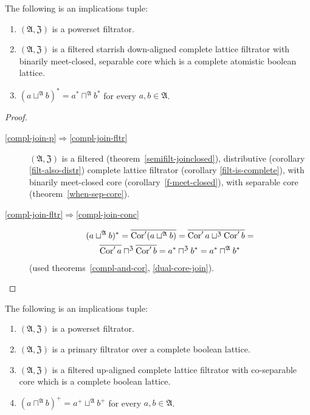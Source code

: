 \begin{thm}
\label{compl-join}The following is an implications tuple:
\begin{enumerate}
\item \label{compl-join-p}$(\mathfrak{A},\mathfrak{Z})$ is a powerset
filtrator.
\item \label{compl-join-fltr}$(\mathfrak{A},\mathfrak{Z})$ is a filtered
starrish down-aligned complete lattice filtrator with binarily meet-closed,
separable core which is a complete atomistic boolean lattice.
\item \label{compl-join-conc}$(a\sqcup^{\mathfrak{A}}b)^{\ast}=a^{\ast}\sqcap^{\mathfrak{A}}b^{\ast}$
for every $a,b\in\mathfrak{A}$.
\end{enumerate}
\end{thm}
\begin{proof}
~
\begin{description}
\item [{\ref{compl-join-p}$\Rightarrow$\ref{compl-join-fltr}}] $(\mathfrak{A},\mathfrak{Z})$
is a filtered (theorem~\ref{semifilt-joinclosed}), distributive
(corollary \ref{filt-also-distr}) complete lattice filtrator (corollary
\ref{filt-is-complete}), with binarily meet-closed core (corollary~\ref{f-meet-closed}),
with separable core (theorem~\ref{when-sep-core}).
\item [{\ref{compl-join-fltr}$\Rightarrow$\ref{compl-join-conc}}]
\begin{multline*}
(a\sqcup^{\mathfrak{A}}b)^{\ast}=\overline{\operatorname{Cor}'(a\sqcup^{\mathfrak{A}}b)}=\overline{\operatorname{Cor}'a\sqcup^{\mathfrak{Z}}\operatorname{Cor}'b}=\\\overline{\operatorname{Cor}'a}\sqcap^{\mathfrak{Z}}\overline{\operatorname{Cor}'b}=a^{\ast}\sqcap^{\mathfrak{Z}}b^{\ast}=a^{\ast}\sqcap^{\mathfrak{A}}b^{\ast}
\end{multline*}
(used theorems~\ref{compl-and-cor}, \ref{dual-core-join}).
\end{description}
\end{proof}

\begin{thm}
The following is an implications tuple:
\begin{enumerate}
\item \label{meet-dpseudo-p}$(\mathfrak{A},\mathfrak{Z})$ is a powerset filtrator.
\item \label{meet-dpseudo-f}$(\mathfrak{A},\mathfrak{Z})$ is a primary filtrator over a complete boolean lattice.
\item \label{meet-dpseudo-fltr}$(\mathfrak{A},\mathfrak{Z})$ is a filtered up-aligned complete lattice filtrator with
co-separable core which is a complete boolean lattice.
\item \label{meet-dpseudo-res}$(a\sqcap^{\mathfrak{A}}b)^{+}=a^{+}\sqcup^{\mathfrak{A}}b^{+}$
for every $a,b\in\mathfrak{A}$.
\end{enumerate}
\end{thm}

